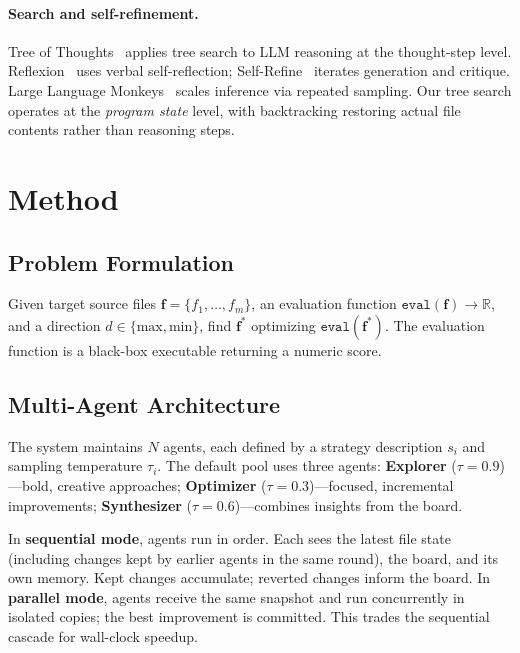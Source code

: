 \documentclass{article}
\begin{document}
\paragraph{Search and self-refinement.}
Tree of Thoughts~\cite{yao2023tree} applies tree search to LLM reasoning at the thought-step level.
Reflexion~\cite{shinn2023reflexion} uses verbal self-reflection; Self-Refine~\cite{madaan2023selfrefine} iterates generation and critique.
Large Language Monkeys~\cite{brown2024large} scales inference via repeated sampling.
Our tree search operates at the \emph{program state} level, with backtracking restoring actual file contents rather than reasoning steps.

\section{Method}
\label{sec:method}

\subsection{Problem Formulation}

Given target source files $\mathbf{f} = \{f_1, \ldots, f_m\}$, an evaluation function $\texttt{eval}(\mathbf{f}) \to \mathbb{R}$, and a direction $d \in \{\text{max}, \text{min}\}$, find $\mathbf{f}^*$ optimizing $\texttt{eval}(\mathbf{f}^*)$. The evaluation function is a black-box executable returning a numeric score.

\subsection{Multi-Agent Architecture}

The system maintains $N$ agents, each defined by a strategy description $s_i$ and sampling temperature $\tau_i$. The default pool uses three agents:
\textbf{Explorer} ($\tau{=}0.9$)---bold, creative approaches;
\textbf{Optimizer} ($\tau{=}0.3$)---focused, incremental improvements;
\textbf{Synthesizer} ($\tau{=}0.6$)---combines insights from the board.

In \textbf{sequential mode}, agents run in order. Each sees the latest file state (including changes kept by earlier agents in the same round), the board, and its own memory. Kept changes accumulate; reverted changes inform the board. In \textbf{parallel mode}, agents receive the same snapshot and run concurrently in isolated copies; the best improvement is committed. This trades the sequential cascade for wall-clock speedup.
\end{document}

